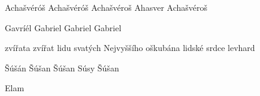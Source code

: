  {Achašvéróš} {Achašvéróš} {Achašvéroš} {Ahasver} {Achašvéroš}

 {Gavríél} {Gabriel} {Gabriel} {Gabriel} {}

 {} {} {zvířata} {} {} %
  {} {} {zvířat}  {} {} %
  {} {} {lidu svatých Nejvyššího}  {} {} %
  {} {} {oškubána}  {} {} %
  {} {} {lidské srdce}  {} {} %
  {} {} {levhard}  {} {}

 {Šúšán} {Šúšan} {Šúšan} {Súsy} {Šúšan} %

  {} {} {Elam}  {} {} %

